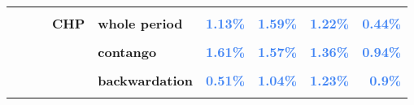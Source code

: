 \documentclass[
  authoryear,
  preprint,
  3p]{elsarticle}
\begin{document}
\begin{landscape}
\begin{longtable}[t]{>{}l>{}l>{}l>{}l>{}l>{}r>{}r>{}r>{}r}
\textbf{\cellcolor{gray!10}{}} & \textbf{\cellcolor{gray!10}{}} & \textbf{\cellcolor{gray!10}{}} & \textbf{\cellcolor{gray!10}{}} & \textbf{\cellcolor{gray!10}{contango}} & \textcolor[HTML]{4285f4}{\textbf{\cellcolor{gray!10}{3.87\%}}} & \textcolor[HTML]{4285f4}{\textbf{\cellcolor{gray!10}{9.02\%}}} & \textcolor[HTML]{4285f4}{\textbf{\cellcolor{gray!10}{21.64\%}}} & \textcolor[HTML]{4285f4}{\textbf{\cellcolor{gray!10}{8.6\%}}}\\
\textbf{} & \textbf{} & \textbf{} & \textbf{CHP} & \textbf{whole period} & \textcolor[HTML]{4285f4}{\textbf{1.13\%}} & \textcolor[HTML]{4285f4}{\textbf{1.59\%}} & \textcolor[HTML]{4285f4}{\textbf{1.22\%}} & \textcolor[HTML]{4285f4}{\textbf{0.44\%}}\\
\textbf{\cellcolor{gray!10}{}} & \textbf{\cellcolor{gray!10}{}} & \textbf{\cellcolor{gray!10}{}} & \textbf{\cellcolor{gray!10}{}} & \textbf{\cellcolor{gray!10}{backwardation}} & \textcolor[HTML]{4285f4}{\textbf{\cellcolor{gray!10}{1.11\%}}} & \textcolor[HTML]{4285f4}{\textbf{\cellcolor{gray!10}{2.07\%}}} & \textcolor[HTML]{4285f4}{\textbf{\cellcolor{gray!10}{1.49\%}}} & \textcolor[HTML]{4285f4}{\textbf{\cellcolor{gray!10}{1.35\%}}}\\
\addlinespace
\textbf{} & \textbf{} & \textbf{} & \textbf{} & \textbf{contango} & \textcolor[HTML]{4285f4}{\textbf{1.61\%}} & \textcolor[HTML]{4285f4}{\textbf{1.57\%}} & \textcolor[HTML]{4285f4}{\textbf{1.36\%}} & \textcolor[HTML]{4285f4}{\textbf{0.94\%}}\\
\textbf{\cellcolor{gray!10}{}} & \textbf{\cellcolor{gray!10}{}} & \textbf{\cellcolor{gray!10}{}} & \textbf{\cellcolor{gray!10}{open interest}} & \textbf{\cellcolor{gray!10}{whole period}} & \textcolor[HTML]{4285f4}{\textbf{\cellcolor{gray!10}{0.29\%}}} & \textcolor[HTML]{4285f4}{\textbf{\cellcolor{gray!10}{0.28\%}}} & \textcolor[HTML]{4285f4}{\textbf{\cellcolor{gray!10}{0.36\%}}} & \textcolor[HTML]{4285f4}{\textbf{\cellcolor{gray!10}{0.28\%}}}\\
\textbf{} & \textbf{} & \textbf{} & \textbf{} & \textbf{backwardation} & \textcolor[HTML]{4285f4}{\textbf{0.51\%}} & \textcolor[HTML]{4285f4}{\textbf{1.04\%}} & \textcolor[HTML]{4285f4}{\textbf{1.23\%}} & \textcolor[HTML]{4285f4}{\textbf{0.9\%}}\\
\textbf{\cellcolor{gray!10}{}} & \textbf{\cellcolor{gray!10}{}} & \textbf{\cellcolor{gray!10}{}} & \textbf{\cellcolor{gray!10}{}} & \textbf{\cellcolor{gray!10}{contango}} & \textcolor[HTML]{4285f4}{\textbf{\cellcolor{gray!10}{0.4\%}}} & \textcolor[HTML]{4285f4}{\textbf{\cellcolor{gray!10}{0.35\%}}} & \textcolor[HTML]{4285f4}{\textbf{\cellcolor{gray!10}{0.66\%}}} & \textcolor[HTML]{4285f4}{\textbf{\cellcolor{gray!10}{0.3\%}}}\\

\end{longtable}
\end{landscape}
\end{document}
